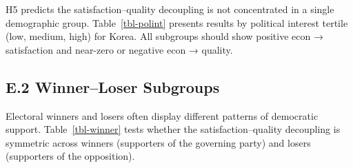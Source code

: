 \documentclass[
  12pt,
  letterpaper]{article}
\begin{document}
H5 predicts the satisfaction--quality decoupling is not concentrated in
a single demographic group. Table~\ref{tbl-polint} presents results by
political interest tertile (low, medium, high) for Korea. All subgroups
should show positive econ → satisfaction and near-zero or negative econ
→ quality.

\begin{table}

\caption{\label{tbl-polint}Korea: econ to DV by political interest
subgroup}


\end{table}%

\subsection{E.2 Winner--Loser
Subgroups}\label{e.2-winnerloser-subgroups}

Electoral winners and losers often display different patterns of
democratic support. Table~\ref{tbl-winner} tests whether the
satisfaction--quality decoupling is symmetric across winners (supporters
of the governing party) and losers (supporters of the opposition).
\end{document}
